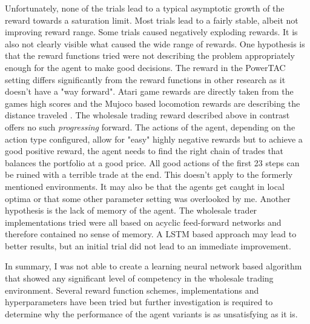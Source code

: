 Unfortunately, none of the trials lead to a typical asymptotic growth of the reward towards a saturation limit. Most
trials lead to a fairly stable, albeit not improving reward range. Some trials caused negatively exploding rewards. 
It is also not clearly visible what caused the wide range of rewards. One hypothesis is that the reward functions tried
were not describing the problem appropriately enough for the agent to make good decisions. The reward in the
\ac{PowerTAC} setting differs significantly from the reward functions in other research as it doesn't have a "way
forward". Atari game rewards are directly taken from the games high scores and the Mujoco based locomotion rewards are 
describing the distance traveled \cite[]{heess2017emergence}. The wholesale trading reward described above in contrast offers no
such \emph{progressing} forward. The actions of the agent, depending on the action type configured, allow for "easy" highly
negative rewards but to achieve a good positive reward, the agent needs to find the right chain of trades that balances
the portfolio at a good price. All good actions of the first 23 steps can be ruined with a terrible trade at the end.
This doesn't apply to the formerly mentioned environments. It may also be that the agents get caught in local optima or that
some other parameter setting was overlooked by me. Another hypothesis is the lack of memory of the agent. The wholesale
trader implementations tried were all based on acyclic feed-forward networks and therefore contained no sense of memory.
A \ac{LSTM} based approach may lead to better results, but an initial trial did not lead to an immediate improvement.

In summary, I was not able to create a learning neural network based algorithm that showed any significant level of
competency in the wholesale trading environment. Several reward function schemes, implementations and hyperparameters
have been tried but further investigation is required to determine why the performance of the agent variants is as
unsatisfying as it is. 





